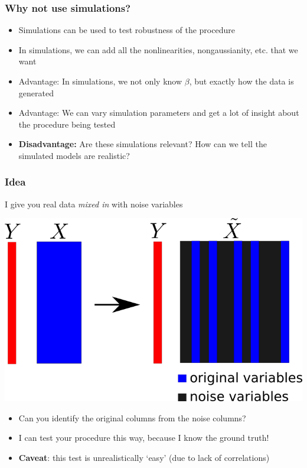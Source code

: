 \documentclass{beamer}
\begin{document}
\begin{frame}
\frametitle{Why not use simulations?}
\begin{itemize}
\item<1> Simulations can be used to test robustness of the procedure
\item<1> In simulations, we can add all the nonlinearities, nongaussianity, etc. that we want
\item<2-> Advantage: In simulations, we not only know $\beta$, but exactly how the data is generated
\item<2-> Advantage: We can vary simulation parameters and get a lot of insight about the procedure being tested
\item<3> \textbf{Disadvantage:} Are these simulations relevant?  How can we tell the simulated models are realistic?
\end{itemize}
\end{frame}

\begin{frame}
\frametitle{Idea}
I give you real data \emph{mixed in} with noise variables
\begin{center}
\includegraphics[scale = 0.35]{anc.png}
\end{center}
\begin{itemize}
\item<1-> Can you identify the original columns from the noise columns?
\item<2-> I can test your procedure this way, because I know the ground truth!
\item<3-> \textbf{Caveat}: this test is unrealistically `easy' (due to lack of correlations)
\end{itemize}
\end{frame}
\end{document}
